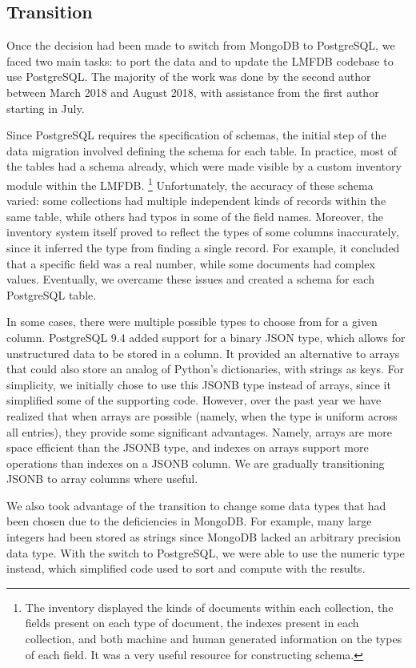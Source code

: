 \documentclass{amsart}
\begin{document}
\subsection{Transition}

Once the decision had been made to switch from MongoDB to PostgreSQL, we faced two main tasks: to port the data and to update the LMFDB codebase to use PostgreSQL.
The majority of the work was done by the second author between March 2018 and August 2018, with assistance from the first author starting in July.

Since PostgreSQL requires the specification of schemas, the initial step of the data migration involved defining the schema for each table.
In practice, most of the tables had a schema already, which were made visible by a custom inventory module within the LMFDB.%
\footnote{The inventory displayed the kinds of documents within each collection, the fields present on each type of document, the indexes present in each collection, and both machine and human generated information on the types of each field.
It was a very useful resource for constructing schema.}
Unfortunately, the accuracy of these schema varied: some collections had multiple independent kinds of records within the same table, while others had typos in some of the field names.
Moreover, the inventory system itself proved to reflect the types of some columns inaccurately, since it inferred the type from finding a single record.
For example, it concluded that a specific field was a real number, while some documents had complex values.
Eventually, we overcame these issues and created a schema for each PostgreSQL table.

In some cases, there were multiple possible types to choose from for a given column.
PostgreSQL 9.4 added support for a binary JSON type, which allows for unstructured data to be stored in a column.
It provided an alternative to arrays that could also store an analog of Python's dictionaries, with strings as keys.
For simplicity, we initially chose to use this JSONB type instead of arrays, since it simplified some of the supporting code.
However, over the past year we have realized that when arrays are possible (namely, when the type is uniform across all entries), they provide some significant advantages.
Namely, arrays are more space efficient than the JSONB type, and indexes on arrays support more operations than indexes on a JSONB column.
We are gradually transitioning JSONB to array columns where useful.

We also took advantage of the transition to change some data types that had been chosen due to the deficiencies in MongoDB.
For example, many large integers had been stored as strings since MongoDB lacked an arbitrary precision data type.
With the switch to PostgreSQL, we were able to use the numeric type instead, which simplified code used to sort and compute with the results.
\end{document}
